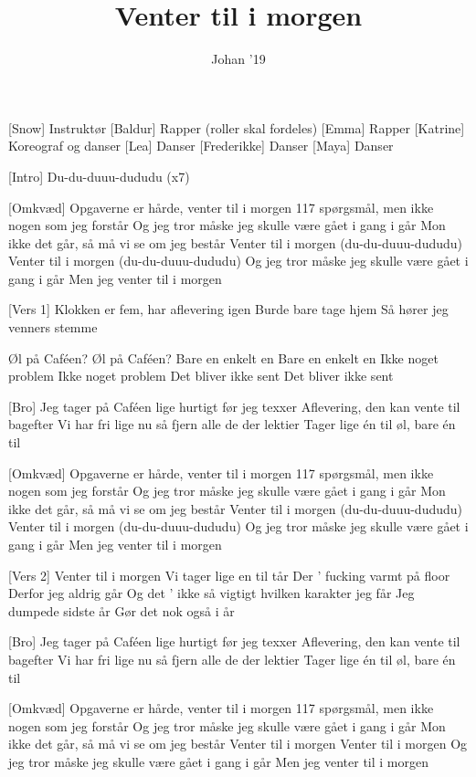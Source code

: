 \documentclass[a4paper,11pt]{article}
\title{Venter til i morgen}
\author{Johan ’19}
\begin{document}
\maketitle

\begin{roles}
[Snow] Instruktør
[Baldur] Rapper (roller skal fordeles)
[Emma] Rapper
[Katrine] Koreograf og danser
[Lea] Danser
[Frederikke] Danser
[Maya] Danser
\end{roles}

\begin{song}
[Intro] Du-du-duuu-dududu (x7)


[Omkvæd] Opgaverne er hårde, venter til i morgen
117 spørgsmål, men ikke nogen som jeg forstår
Og jeg tror måske jeg skulle være gået i gang i går
Mon ikke det går, så må vi se om jeg består
Venter til i morgen (du-du-duuu-dududu)
Venter til i morgen (du-du-duuu-dududu)
Og jeg tror måske jeg skulle være gået i gang i går
Men jeg venter til i morgen

[Vers 1] Klokken er fem, har aflevering igen
Burde bare tage hjem
Så hører jeg venners stemme

 Øl på Caféen?
 Øl på Caféen?
 Bare en enkelt en
 Bare en enkelt en
 Ikke noget problem
 Ikke noget problem
 Det bliver ikke sent
 Det bliver ikke sent

[Bro] Jeg tager på Caféen lige hurtigt før jeg texxer
Aflevering, den kan vente til bagefter
Vi har fri lige nu så fjern alle de der lektier
Tager lige én til øl, bare én til


[Omkvæd] Opgaverne er hårde, venter til i morgen
117 spørgsmål, men ikke nogen som jeg forstår
Og jeg tror måske jeg skulle være gået i gang i går
Mon ikke det går, så må vi se om jeg består
Venter til i morgen (du-du-duuu-dududu)
Venter til i morgen (du-du-duuu-dududu)
Og jeg tror måske jeg skulle være gået i gang i går
Men jeg venter til i morgen

[Vers 2] Venter til i morgen
Vi tager lige en til tår
Der ’ fucking varmt på floor
Derfor jeg aldrig går
Og det ’ ikke så vigtigt hvilken karakter jeg får
Jeg dumpede sidste år
Gør det nok også i år

[Bro] Jeg tager på Caféen lige hurtigt før jeg texxer
Aflevering, den kan vente til bagefter
Vi har fri lige nu så fjern alle de der lektier
Tager lige én til øl, bare én til

[Omkvæd] Opgaverne er hårde, venter til i morgen
117 spørgsmål, men ikke nogen som jeg forstår
Og jeg tror måske jeg skulle være gået i gang i går
Mon ikke det går, så må vi se om jeg består
Venter til i morgen
Venter til i morgen
Og jeg tror måske jeg skulle være gået i gang i går
Men jeg venter til i morgen



\end{song}
\end{document}
